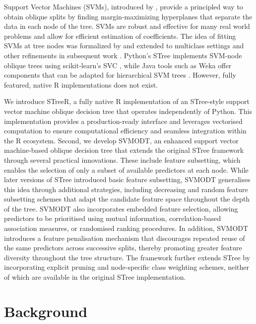 Support Vector Machines (SVMs), introduced by \citet{cortes1995}, provide a principled way to obtain oblique splits by finding margin‑maximizing hyperplanes that separate the data in each node of the tree. SVMs are robust and effective for many real world problems and allow for efficient estimation of coefficients. The idea of fitting SVMs at tree nodes was formalized by \citet{bennet1998} and extended to multiclass settings and other refinements in subsequent work \citep{takahashi2002, bala2011, ganaie2022}. Python's STree implements SVM‑node oblique trees using scikit‑learn's SVC \citep{Montanana2021, scikit2011}, while Java tools such as Weka offer components that can be adapted for hierarchical SVM trees \citep{menkovski2008}. However, fully featured, native R implementations does not exist.

We introduce STreeR, a fully native R implementation of an STree-style support vector machine oblique decision tree that operates independently of Python. This implementation provides a production-ready interface and leverages vectorised computation to ensure computational efficiency and seamless integration within the R ecosystem. Second, we develop SVMODT, an enhanced support vector machine-based oblique decision tree that extends the original STree framework through several practical innovations. These include feature subsetting, which enables the selection of only a subset of available predictors at each node. While later versions of STree introduced basic feature subsetting, SVMODT generalises this idea through additional strategies, including decreasing and random feature subsetting schemes that adapt the candidate feature space throughout the depth of the tree. SVMODT also incorporates embedded feature selection, allowing predictors to be prioritised using mutual information, correlation-based association measures, or randomised ranking procedures. In addition, SVMODT introduces a feature penalisation mechanism that discourages repeated reuse of the same predictors across successive splits, thereby promoting greater feature diversity throughout the tree structure. The framework further extends STree by incorporating explicit pruning and node-specific class weighting schemes, neither of which are available in the original STree implementation.

\section{Background}\label{background}

